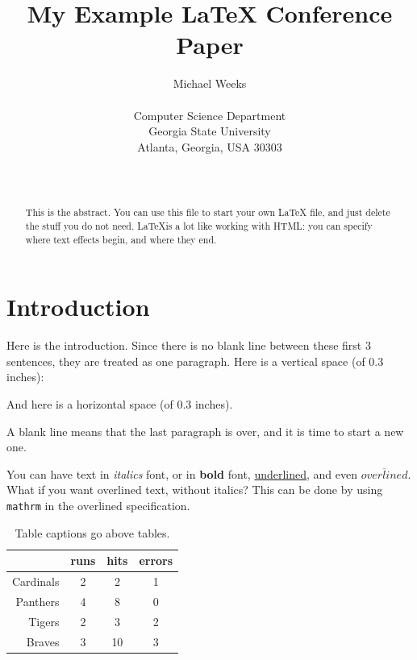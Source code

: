 \documentclass[conference]{IEEEconf}
\begin{document}
  \title{My Example LaTeX Conference Paper}
  \author{Michael Weeks \\
  \begin{affiliation}
   Computer Science Department\\
   Georgia State University\\
   Atlanta, Georgia, USA 30303\\
\end{affiliation} \\
}
  \maketitle


\begin{abstract}
This is the abstract. You can use this file to start your own LaTeX file,
and just delete the stuff you do not need. \LaTeX  is a lot like working
with HTML: you can specify where text effects begin, and where they end.
\end{abstract}

\section{Introduction}\label{sec:intro}
Here is the introduction.
Since there is no blank line between these first 3 sentences, they are 
treated as one paragraph. 
Here is a vertical space (of 0.3 inches):
\vspace{.3in}

And here is a \hspace{.3in}horizontal space (of 0.3 inches).

A blank line means that the last paragraph is over, and it is time to start
a new one.

You can have text in {\it italics} font, or in {\bf bold} font,
\underline{underlined}, and even $\overline{overlined}$.
What if you want overlined text, without italics? This can
be done by using \verb"mathrm" in the 
$\overline{\mathrm{overlined}}$ specification.




\begin{table}[!hbt]
\begin{center}
  \caption{Table captions go above tables.}
  \vspace{0.2in}
  \begin{tabular}{|r|c|c|c|}
     \hline
 & runs & hits & errors  \\
     \hline
Cardinals  & 2 & 2 & 1  \\
Panthers & 4 & 8 & 0  \\
Tigers  & 2 & 3 & 2  \\
Braves  & 3 & 10 & 3  \\
     \hline
  \end{tabular}
  \label{tab:example_tab}
\end{center}
\end{table}
\end{document}

